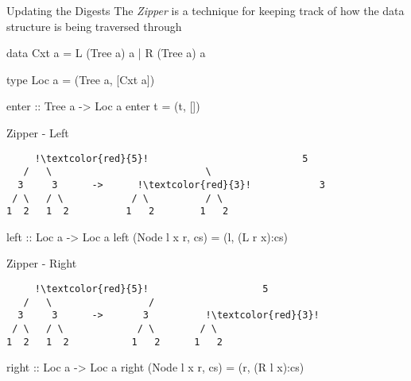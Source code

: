\begin{slide}{Updating the Digests}
The \textit{Zipper} is a technique for keeping track of how the data structure is being traversed through

\begin{haskell}
data Cxt a = L (Tree a) a | R (Tree a) a

type Loc a = (Tree a, [Cxt a])

enter :: Tree a -> Loc a
enter t = (t, [])
\end{haskell}
\end{slide}

\begin{slide}{Zipper - Left}
\begin{center}
\begin{verbatim}
     !\textcolor{red}{5}!                           5     
   /   \                           \    
  3     3      ->      !\textcolor{red}{3}!            3    
 / \   / \            / \          / \  
1  2   1  2          1   2        1   2 
\end{verbatim}

\vspace*{0.4cm}
\begin{haskell}
left :: Loc a -> Loc a
left (Node l x r, cs) = (l, (L r x):cs)
\end{haskell}
\end{center}
\end{slide}

\begin{slide}{Zipper - Right}
\begin{center}
\begin{verbatim}
     !\textcolor{red}{5}!                    5     
   /   \                 /           
  3     3      ->       3          !\textcolor{red}{3}!  
 / \   / \             / \        / \ 
1  2   1  2           1   2      1   2
\end{verbatim}

\vspace*{0.4cm}
\begin{haskell}
right :: Loc a -> Loc a
right (Node l x r, cs) = (r, (R l x):cs)
\end{haskell}
\end{center}
\end{slide}

